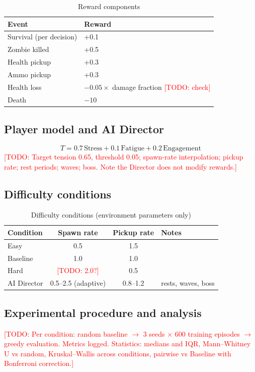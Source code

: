 \documentclass[10pt,a4paper]{article}
\newcommand{\todo}[1]{\textcolor{red}{[TODO: #1]}}
\begin{document}
\begin{table}[h]
\centering
\caption{Reward components}
\label{tab:reward}
\begin{tabular}{ll}
\toprule
Event & Reward \\
\midrule
Survival (per decision) & +0.1 \\
Zombie killed & +0.5 \\
Health pickup & +0.3 \\
Ammo pickup & +0.3 \\
Health loss & $-0.05 \times$ damage fraction \todo{check} \\
Death & $-10$ \\
\bottomrule
\end{tabular}
\end{table}

\subsection{Player model and AI Director}
\begin{equation}
T = 0.7\,\text{Stress} + 0.1\,\text{Fatigue} + 0.2\,\text{Engagement}
\end{equation}
\todo{Target tension 0.65, threshold 0.05; spawn-rate interpolation; pickup rate;
rest periods; waves; boss. Note the Director does not modify rewards.}

\subsection{Difficulty conditions}
\begin{table}[h]
\centering
\caption{Difficulty conditions (environment parameters only)}
\label{tab:conditions}
\begin{tabular}{lccl}
\toprule
Condition & Spawn rate & Pickup rate & Notes \\
\midrule
Easy & 0.5 & 1.5 & \\
Baseline & 1.0 & 1.0 & \\
Hard & \todo{2.0?} & 0.5 & \\
AI Director & 0.5--2.5 (adaptive) & 0.8--1.2 & rests, waves, boss \\
\bottomrule
\end{tabular}
\end{table}

\subsection{Experimental procedure and analysis}
\todo{Per condition: random baseline $\rightarrow$ 3 seeds $\times$ 600 training episodes
$\rightarrow$ greedy evaluation. Metrics logged. Statistics: medians and IQR,
Mann--Whitney U vs random, Kruskal--Wallis across conditions, pairwise vs Baseline
with Bonferroni correction.}
\end{document}

